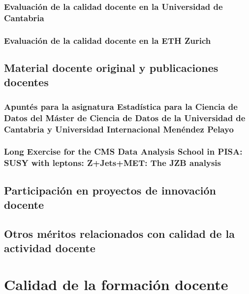 \documentclass[a4paper, 11pt, twoside, openright]{report}
\begin{document}
\subsubsection{Evaluación de la calidad docente en la Universidad de Cantabria}


\subsubsection{Evaluación de la calidad docente en la ETH Zurich}


\subsection{Material docente original y publicaciones docentes}

\subsubsection{Apuntés para la asignatura Estadística para la Ciencia de Datos del Máster de Ciencia de Datos de la Universidad de Cantabria y Universidad Internacional Menéndez Pelayo}


\subsubsection{Long Exercise for the CMS Data Analysis School in PISA: SUSY with leptons: Z+Jets+MET: The JZB analysis}



\subsection{Participación en proyectos de innovación docente}

\subsection{Otros méritos relacionados con calidad de la actividad docente}

\section{Calidad de la formación docente}
\end{document}
